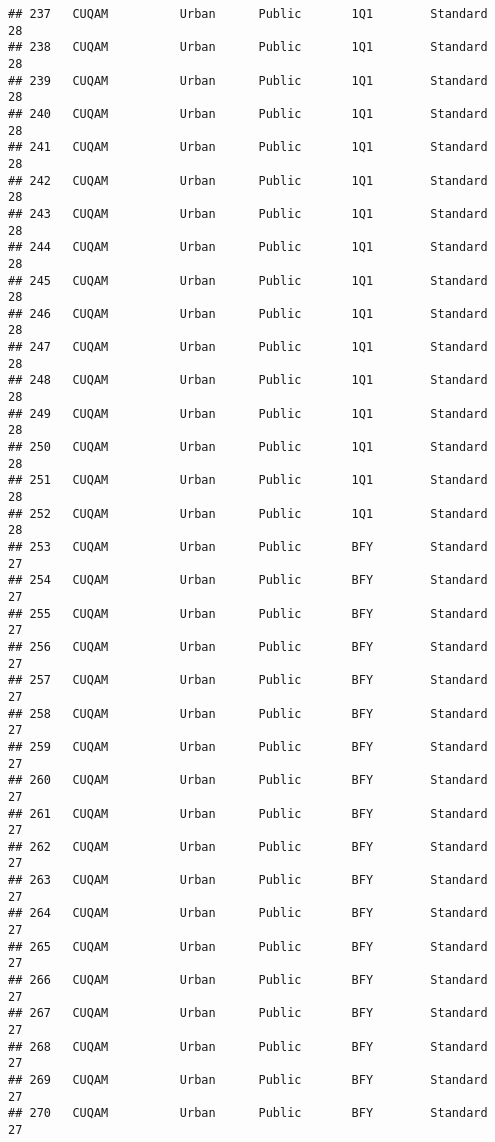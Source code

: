 \documentclass[
]{article}
\begin{document}
\begin{verbatim}
## 237   CUQAM          Urban      Public       1Q1        Standard        28
## 238   CUQAM          Urban      Public       1Q1        Standard        28
## 239   CUQAM          Urban      Public       1Q1        Standard        28
## 240   CUQAM          Urban      Public       1Q1        Standard        28
## 241   CUQAM          Urban      Public       1Q1        Standard        28
## 242   CUQAM          Urban      Public       1Q1        Standard        28
## 243   CUQAM          Urban      Public       1Q1        Standard        28
## 244   CUQAM          Urban      Public       1Q1        Standard        28
## 245   CUQAM          Urban      Public       1Q1        Standard        28
## 246   CUQAM          Urban      Public       1Q1        Standard        28
## 247   CUQAM          Urban      Public       1Q1        Standard        28
## 248   CUQAM          Urban      Public       1Q1        Standard        28
## 249   CUQAM          Urban      Public       1Q1        Standard        28
## 250   CUQAM          Urban      Public       1Q1        Standard        28
## 251   CUQAM          Urban      Public       1Q1        Standard        28
## 252   CUQAM          Urban      Public       1Q1        Standard        28
## 253   CUQAM          Urban      Public       BFY        Standard        27
## 254   CUQAM          Urban      Public       BFY        Standard        27
## 255   CUQAM          Urban      Public       BFY        Standard        27
## 256   CUQAM          Urban      Public       BFY        Standard        27
## 257   CUQAM          Urban      Public       BFY        Standard        27
## 258   CUQAM          Urban      Public       BFY        Standard        27
## 259   CUQAM          Urban      Public       BFY        Standard        27
## 260   CUQAM          Urban      Public       BFY        Standard        27
## 261   CUQAM          Urban      Public       BFY        Standard        27
## 262   CUQAM          Urban      Public       BFY        Standard        27
## 263   CUQAM          Urban      Public       BFY        Standard        27
## 264   CUQAM          Urban      Public       BFY        Standard        27
## 265   CUQAM          Urban      Public       BFY        Standard        27
## 266   CUQAM          Urban      Public       BFY        Standard        27
## 267   CUQAM          Urban      Public       BFY        Standard        27
## 268   CUQAM          Urban      Public       BFY        Standard        27
## 269   CUQAM          Urban      Public       BFY        Standard        27
## 270   CUQAM          Urban      Public       BFY        Standard        27

\end{verbatim}
\end{document}
